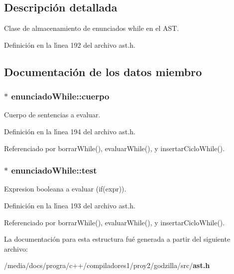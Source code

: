 \subsection{Descripci\'{o}n detallada}
Clase de almacenamiento de enunciados while en el AST. 



Definici\'{o}n en la l\'{\i}nea 192 del archivo ast.h.

\subsection{Documentaci\'{o}n de los datos miembro}
\subsubsection{$\ast$ {\bf enunciado\-While::cuerpo}}\label{structenunciadoWhile_o1}


Cuerpo de sentencias a evaluar. 



Definici\'{o}n en la l\'{\i}nea 194 del archivo ast.h.

Referenciado por borrar\-While(), evaluar\-While(), y insertar\-Ciclo\-While().
\subsubsection{$\ast$ {\bf enunciado\-While::test}}\label{structenunciadoWhile_o0}


Expresion booleana a evaluar (if(expr)). 



Definici\'{o}n en la l\'{\i}nea 193 del archivo ast.h.

Referenciado por borrar\-While(), evaluar\-While(), y insertar\-Ciclo\-While().

La documentaci\'{o}n para esta estructura fu\'{e} generada a partir del siguiente archivo:\begin{CompactItemize}
\item 
/media/docs/progra/c++/compiladores1/proy2/godzilla/src/{\bf ast.h}\end{CompactItemize}
